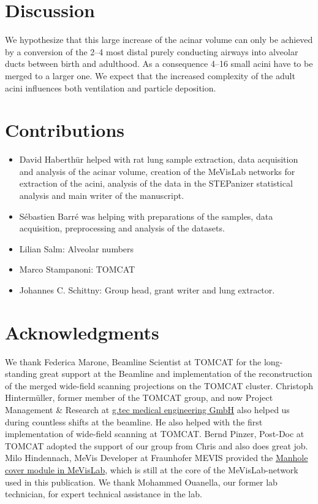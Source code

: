 \documentclass[%
	draft=true,
	paper=a4,%
	twoside=true,%
	abstract=true]{scrartcl}
\begin{document}
\section{Discussion}\label{sec:Discussion}
We hypothesize that this large increase of the acinar volume can only be achieved by a conversion of the \numrange{2}{4} most distal purely conducting airways into alveolar ducts between birth and adulthood. As a consequence \numrange{4}{16} small acini have to be merged to a larger one. We expect that the increased complexity of the adult acini influences both ventilation and particle deposition.

\section{Contributions}
\begin{itemize}
	\item David Haberthür helped with rat lung sample extraction, data acquisition and analysis of the acinar volume, creation of the MeVisLab networks for extraction of the acini, analysis of the data in the STEPanizer statistical analysis and main writer of the manuscript.
	\item Sébastien Barré was helping with preparations of the samples, data acquisition,  preprocessing and analysis of the datasets.
	\item Lilian Salm: Alveolar numbers
	\item Marco Stampanoni: TOMCAT
	\item Johannes C. Schittny: Group head, grant writer and lung extractor.
\end{itemize}

\section{Acknowledgments}
We thank Federica Marone, Beamline Scientist at TOMCAT for the long-standing great support at the Beamline and implementation of the reconstruction of the merged wide-field scanning projections on the TOMCAT cluster. Christoph Hinterm\"{u}ller, former member of the TOMCAT group, and now Project Management \& Research at \href{http://gtec.at/}{g.tec medical engineering GmbH} also helped us during countless shifts at the beamline. He also helped with the first implementation of wide-field scanning at TOMCAT. Bernd Pinzer, Post-Doc at TOMCAT adopted the support of our group from Chris and also does great job. Milo Hindennach, MeVis Developer at Fraunhofer MEVIS provided the \href{http://www.mevis-research.de/cgi-bin/discus/board-auth.cgi?lm=1282233250&file=/839/11760.html}{Manhole cover module in MeVisLab}, which is still at the core of the MeVisLab-network used in this publication. We thank Mohammed Ouanella, our former lab technician, for expert technical assistance in the lab.
\end{document}
